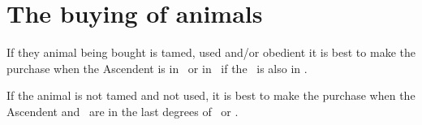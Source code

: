 \section{The buying of animals}
If they animal being bought is tamed, used and/or obedient it is best to make the purchase when the Ascendent is in \Aries\, or in \Taurus\, if the \Moon\, is also in \Taurus.

If the animal is not tamed and not used, it is best to make the purchase when the Ascendent and \Moon\, are in the last degrees of \Leo\, or \Sagittarius.


